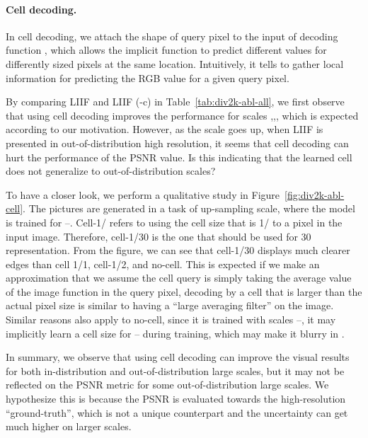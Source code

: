 \documentclass[final]{cvpr}
\begin{document}
\paragraph{Cell decoding.} In cell decoding, we attach the shape of query pixel to the input of decoding function , which allows the implicit function to predict different values for differently sized pixels at the same location. Intuitively, it tells  to gather local information for predicting the RGB value for a given query pixel.

By comparing LIIF and LIIF (-c) in Table~\ref{tab:div2k-abl-all}, we first observe that using cell decoding improves the performance for scales ,,, which is expected according to our motivation. However, as the scale goes up, when LIIF is presented in out-of-distribution high resolution, it seems that cell decoding can hurt the performance of the PSNR value. Is this indicating that the learned cell does not generalize to out-of-distribution scales?

To have a closer look, we perform a qualitative study in Figure~\ref{fig:div2k-abl-cell}. The pictures are generated in a task of  up-sampling scale, where the model is trained for --. Cell-1/ refers to using the cell size that is 1/ to a pixel in the input image. Therefore, cell-1/30 is the one that should be used for 30 representation. From the figure, we can see that cell-1/30 displays much clearer edges than cell 1/1, cell-1/2, and no-cell. This is expected if we make an approximation that we assume the cell query is simply taking the average value of the image function  in the query pixel, decoding by a cell that is larger than the actual pixel size is similar to having a ``large averaging filter'' on the image. Similar reasons also apply to no-cell, since it is trained with scales --, it may implicitly learn a cell size for -- during training, which may make it blurry in .

In summary, we observe that using cell decoding can improve the visual results for both in-distribution and out-of-distribution large scales, but it may not be reflected on the PSNR metric for some out-of-distribution large scales. We hypothesize this is because the PSNR is evaluated towards the high-resolution ``ground-truth'', which is not a unique counterpart and the uncertainty can get much higher on larger scales.

\vspace{-1em}
\end{document}
